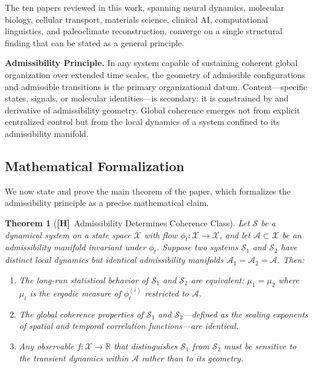 \documentclass[11pt, oneside]{article}
\numberwithin{equation}{section}
\newcommand{\ClaimH}{\textcolor{rsvpgray}{\textbf{[H]}}}
\theoremstyle{rsvpstyle}
\newtheorem{theorem}{Theorem}[section]
\theoremstyle{remark}
\newcommand{\Adm}{\mathcal{A}}
\newcommand{\Rspace}{\mathbb{R}}
\begin{document}
The ten papers reviewed in this work, spanning neural dynamics, molecular biology,
cellular transport, materials science, clinical AI, computational linguistics, and
paleoclimate reconstruction, converge on a single structural finding that can be
stated as a general principle.

\begin{tcolorbox}[rsvpbox, title={The Admissibility Principle}]
\textbf{Admissibility Principle.} In any system capable of sustaining coherent
global organization over extended time scales, the geometry of admissible configurations
and admissible transitions is the primary organizational datum. Content---specific
states, signals, or molecular identities---is secondary: it is constrained by and
derivative of admissibility geometry. Global coherence emerges not from explicit
centralized control but from the local dynamics of a system confined to its
admissibility manifold.
\end{tcolorbox}

\subsection{Mathematical Formalization}

We now state and prove the main theorem of the paper, which formalizes the admissibility
principle as a precise mathematical claim.

\begin{theorem}[\ClaimH\ Admissibility Determines Coherence Class]
\label{thm:main}
Let $\mathcal{S}$ be a dynamical system on a state space $\mathcal{X}$ with flow
$\phi_t : \mathcal{X} \to \mathcal{X}$, and let $\Adm \subset \mathcal{X}$ be an
admissibility manifold invariant under $\phi_t$. Suppose two systems $\mathcal{S}_1$
and $\mathcal{S}_2$ have distinct local dynamics but identical admissibility manifolds
$\Adm_1 = \Adm_2 = \Adm$. Then:
\begin{enumerate}[label=(\roman*)]
  \item The long-run statistical behavior of $\mathcal{S}_1$ and $\mathcal{S}_2$ are
    equivalent: $\mu_1 = \mu_2$ where $\mu_i$ is the ergodic measure of $\phi_t^{(i)}$
    restricted to $\Adm$.
  \item The global coherence properties of $\mathcal{S}_1$ and $\mathcal{S}_2$---defined
    as the scaling exponents of spatial and temporal correlation functions---are identical.
  \item Any observable $f : \mathcal{X} \to \Rspace$ that distinguishes $\mathcal{S}_1$
    from $\mathcal{S}_2$ must be sensitive to the transient dynamics within $\Adm$ rather
    than to its geometry.
\end{enumerate}
\end{theorem}
\end{document}
